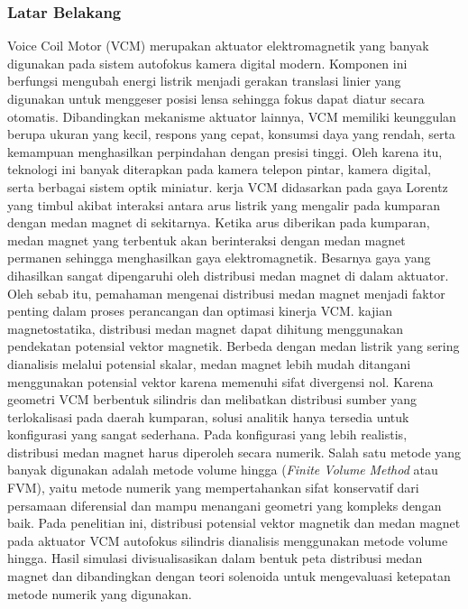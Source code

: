 \documentclass[11pt,a4paper]{article}
\begin{document}
\subsubsection{Latar Belakang}
Voice Coil Motor (VCM) merupakan aktuator elektromagnetik yang banyak digunakan pada sistem autofokus kamera digital modern. Komponen ini berfungsi mengubah energi listrik menjadi gerakan translasi linier yang digunakan untuk menggeser posisi lensa sehingga fokus dapat diatur secara otomatis. Dibandingkan mekanisme aktuator lainnya, VCM memiliki keunggulan berupa ukuran yang kecil, respons yang cepat, konsumsi daya yang rendah, serta kemampuan menghasilkan perpindahan dengan presisi tinggi. Oleh karena itu, teknologi ini banyak diterapkan pada kamera telepon pintar, kamera digital, serta berbagai sistem optik miniatur. kerja VCM didasarkan pada gaya Lorentz yang timbul akibat interaksi antara arus listrik yang mengalir pada kumparan dengan medan magnet di sekitarnya. Ketika arus diberikan pada kumparan, medan magnet yang terbentuk akan berinteraksi dengan medan magnet permanen sehingga menghasilkan gaya elektromagnetik. Besarnya gaya yang dihasilkan sangat dipengaruhi oleh distribusi medan magnet di dalam aktuator. Oleh sebab itu, pemahaman mengenai distribusi medan magnet menjadi faktor penting dalam proses perancangan dan optimasi kinerja VCM. kajian magnetostatika, distribusi medan magnet dapat dihitung menggunakan pendekatan potensial vektor magnetik. Berbeda dengan medan listrik yang sering dianalisis melalui potensial skalar, medan magnet lebih mudah ditangani menggunakan potensial vektor karena memenuhi sifat divergensi nol. Karena geometri VCM berbentuk silindris dan melibatkan distribusi sumber yang terlokalisasi pada daerah kumparan, solusi analitik hanya tersedia untuk konfigurasi yang sangat sederhana. Pada konfigurasi yang lebih realistis, distribusi medan magnet harus diperoleh secara numerik. Salah satu metode yang banyak digunakan adalah metode volume hingga (\textit{Finite Volume} \textit{Method} atau FVM), yaitu metode numerik yang mempertahankan sifat konservatif dari persamaan diferensial dan mampu menangani geometri yang kompleks dengan baik. Pada penelitian ini, distribusi potensial vektor magnetik dan medan magnet pada aktuator VCM autofokus silindris dianalisis menggunakan metode volume hingga. Hasil simulasi divisualisasikan dalam bentuk peta distribusi medan magnet dan dibandingkan dengan teori solenoida untuk mengevaluasi ketepatan metode numerik yang digunakan.
\end{document}
